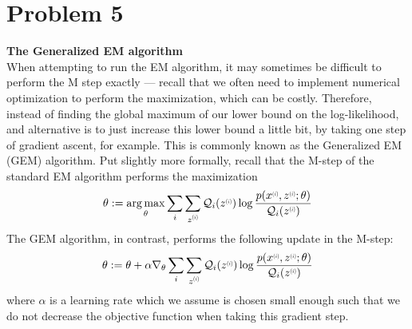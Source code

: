 \documentclass{article}
\DeclareMathOperator*{\argmax}{arg\,max}
\newcommand{\supi}{\scalebox{0.6}[0.75]{$^{(i)}$}}
\begin{document}
\section*{Problem 5}
    \textbf{The Generalized EM algorithm}\\
    When attempting to run the EM algorithm, it may sometimes be difficult to perform the M step exactly — recall that we often need to implement numerical optimization to perform
the maximization, which can be costly. Therefore, instead of finding the global maximum
of our lower bound on the log-likelihood, and alternative is to just increase this lower bound
a little bit, by taking one step of gradient ascent, for example. This is commonly known
as the Generalized EM (GEM) algorithm.
Put slightly more formally, recall that the M-step of the standard EM algorithm performs
the maximization
\begin{align*}
    \theta := \argmax_\theta\sum_i\sum_{z\supi}\mathcal{Q}_i(z\supi)\log\frac{p(x\supi,z\supi;\theta)}{\mathcal{Q}_i(z\supi)}
\end{align*}
The GEM algorithm, in contrast, performs the following update in the M-step:
\begin{align*}
    \theta := \theta + \alpha\nabla_\theta\sum_i\sum_{z\supi}\mathcal{Q}_i(z\supi)\log\frac{p(x\supi,z\supi;\theta)}{\mathcal{Q}_i(z\supi)}
\end{align*}
where $\alpha$ is a learning rate which we assume is chosen small enough such that we do not decrease the objective function when taking this gradient step.
\end{document}
